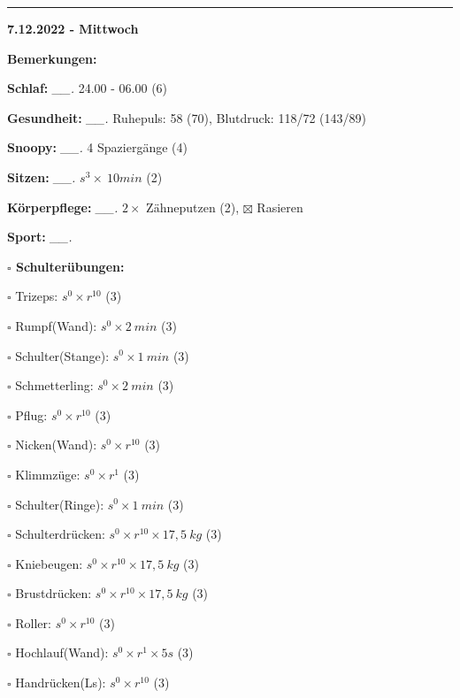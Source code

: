 \documentclass[10pt,a4paper]{article}
\newcommand\prop[1] {{\color {alizarin} {\bf #1}}}             %
\newcommand\rele[1] {{\color {english} \bf {#1}}}              %
\newcommand\mand[1] {{\color {burntorange} {\bf #1}}}          %
\newcommand\ddivide {\vskip -9pt \hrule \vskip 6pt}
\newcommand\topspace{\vskip -15pt \hskip 20pt}
\newcommand\n[1] { {\sl #1.} \hskip 5pt }
\begin{document}
\ddivide
{\rele {7.12.2022 - Mittwoch}}

\begin{mdframed}[style=daystyle]
  \begin{labeling}{{\mand {Bemerkungen:}}}
    \setlength\itemsep{-3pt}
  \item[{\mand {Schlaf:}}]        \n{\_\_} 24.00 - 06.00 (6)
  \item[{\mand {Gesundheit:}}]    \n{\_\_} Ruhepuls: 58 (70), Blutdruck: 118/72 (143/89)
  \item[{\mand {Snoopy:}}]        \n{\_\_} 4 Spaziergänge (4)
  \item[{\mand {Sitzen:}}]        \n{\_\_} $s^3 \times\ 10 min$ (2)
  \item[{\mand {Körperpflege:}}]  \n{\_\_} $2 \times$ Zähneputzen (2), $\boxtimes$ Rasieren
  \item[{\mand {Sport:}}]         \n{\_\_}
    \topspace
    \begin{minipage}{0.75\textwidth}  
      \begin{labeling}{\prop {$\square$ {Schulterübungen:}}} 
        \setlength\itemsep{-3pt}
      \item[$\square$ Trizeps:]          $s^0 \times r^{10}$ (3)
      \item[$\square$ Rumpf(Wand):]      $s^0 \times 2\ min$ (3)
      \item[$\square$ Schulter(Stange):] $s^0 \times 1\ min$ (3)
      \item[$\square$ Schmetterling:]    $s^0 \times 2\ min$ (3)
      \item[$\square$ Pflug:]            $s^0 \times r^{10}$ (3)
      \item[$\square$ Nicken(Wand):]     $s^0 \times r^{10}$ (3)
      \item[$\square$ Klimmzüge:]        $s^0 \times r^1$ (3)
      \item[$\square$ Schulter(Ringe):]  $s^0 \times 1\ min$ (3)
      \item[$\square$ Schulterdrücken:]  $s^0 \times r^{10} \times 17,5\ kg$ (3)
      \item[$\square$ Kniebeugen:]       $s^0 \times r^{10} \times 17,5\ kg$ (3)
      \item[$\square$ Brustdrücken:]     $s^0 \times r^{10} \times 17,5\ kg$ (3)
      \item[$\square$ Roller:]           $s^0 \times r^{10}$ (3)
      \item[$\square$ Hochlauf(Wand):]   $s^0 \times r^{1} \times 5s$ (3)
      \item[$\square$ Handrücken(Ls):]   $s^0 \times r^{10}$ (3)

\end{labeling}
\end{minipage}
\end{labeling}
\end{mdframed}
\end{document}
